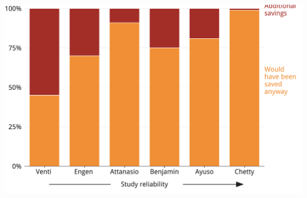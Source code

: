 \documentclass[tikz]{standalone}\usepackage[]{graphicx}\usepackage[]{color}
\newenvironment{knitrout}{}{} %
\begin{document}
\begin{knitrout}
\color{fgcolor}
\includegraphics[width=11.000in,height=7.00in]{./Super-tax-targeting/b5-super-atlas/Figure2-4-1} 

\end{knitrout}
\end{document}
